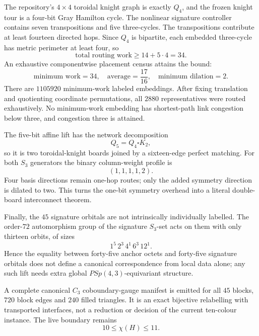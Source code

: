 The repository's $4\times4$ toroidal knight graph is exactly $Q_4$, and the
frozen knight tour is a four-bit Gray Hamilton cycle.  The nonlinear signature
controller contains seven transpositions and five three-cycles.  The
transpositions contribute at least fourteen directed hops.  Since $Q_4$ is
bipartite, each embedded three-cycle has metric perimeter at least four, so
\[
\text{total routing work}\ge14+5\cdot4=34.
\]
An exhaustive componentwise placement census attains the bound:
\[
\boxed{\text{minimum work}=34,\quad
\text{average}=\frac{17}{16},\quad
\text{minimum dilation}=2.}
\]
There are $1105920$ minimum-work labeled embeddings.  After fixing translation
and quotienting coordinate permutations, all $2880$ representatives were
routed exhaustively.  No minimum-work embedding has shortest-path link
congestion below three, and congestion three is attained.

The five-bit affine lift has the network decomposition
\[
Q_5=Q_4\square K_2,
\]
so it is two toroidal-knight boards joined by a sixteen-edge perfect matching.
For both $S_3$ generators the binary column-weight profile is
\[
(1,1,1,1,2).
\]
Four basis directions remain one-hop routes; only the added symmetry direction
is dilated to two.  This turns the one-bit symmetry overhead into a literal
double-board interconnect theorem.

Finally, the $45$ signature orbitals are not intrinsically individually
labelled.  The order-$72$ automorphism group of the signature $S_3$-set acts on
them with only thirteen orbits, of sizes
\[
1^5\,2^3\,4^1\,6^3\,12^1.
\]
Hence the equality between forty-five anchor octets and forty-five signature
orbitals does not define a canonical correspondence from local data alone; any
such lift needs extra global $PSp(4,3)$-equivariant structure.

A complete canonical $C_3$ coboundary-gauge manifest is emitted for all
$45$ blocks, $720$ block edges and $240$ filled triangles.  It is an exact
bijective relabelling with transported interfaces, not a reduction or decision
of the current ten-colour instance.  The live boundary remains
\[
\boxed{10\le\chi(H)\le11}.
\]
